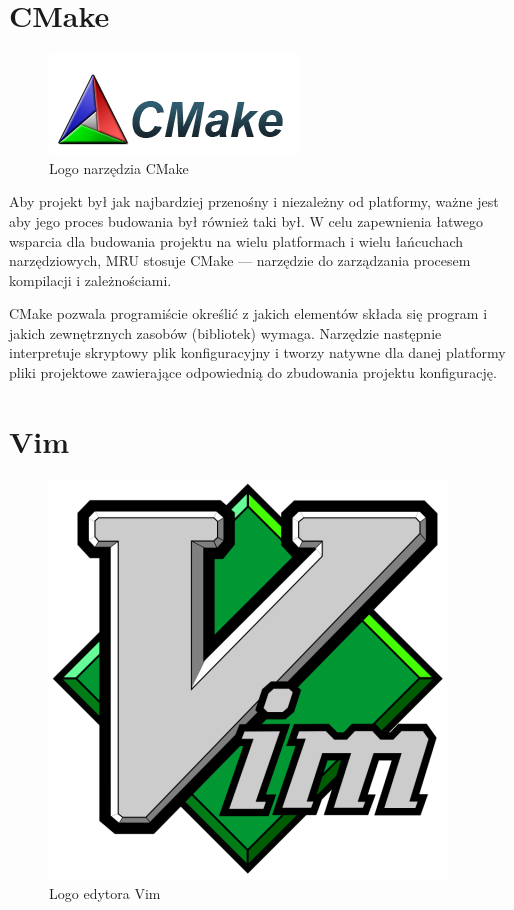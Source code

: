 \section{CMake}
\begin{figure}
\begin{center}
\includegraphics[scale=0.75]{img/cmake_logo.png}
\end{center}
\caption{Logo narzędzia CMake}
\end{figure}

\par
Aby projekt był jak najbardziej przenośny i niezależny od platformy, ważne jest aby jego proces budowania był również taki był.
W celu zapewnienia łatwego wsparcia dla budowania projektu na wielu platformach i wielu łańcuchach narzędziowych, MRU stosuje CMake --- narzędzie do zarządzania procesem kompilacji i zależnościami.
\par
CMake pozwala programiście określić z jakich elementów składa się program i jakich zewnętrznych zasobów (bibliotek) wymaga. Narzędzie następnie interpretuje skryptowy plik konfiguracyjny i tworzy natywne dla danej platformy pliki projektowe zawierające odpowiednią do zbudowania projektu konfigurację.

\section{Vim}
\begin{figure}
\begin{center}
\includegraphics[scale=0.25]{img/vim_logo.png}
\end{center}
\caption{Logo edytora Vim}
\end{figure}

